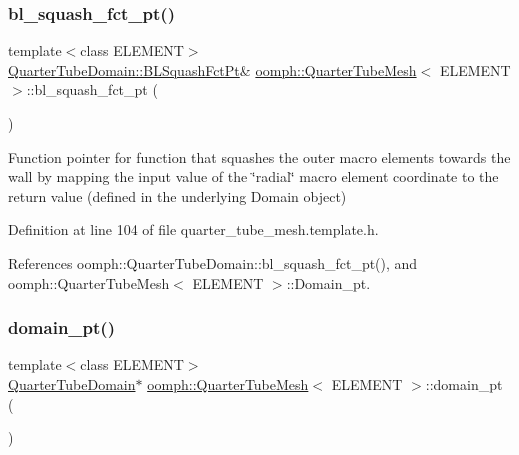 \mbox{\label{classoomph_1_1QuarterTubeMesh_afa145689b62afa7e66573c8c42bda8dd}} 
\subsubsection{\texorpdfstring{bl\+\_\+squash\+\_\+fct\+\_\+pt()}{bl\_squash\_fct\_pt()}}
{\footnotesize\ttfamily template$<$class E\+L\+E\+M\+E\+NT$>$ \\
\hyperlink{classoomph_1_1QuarterTubeDomain_a3d8c15c17d9912d8c519c028437c0b2c}{Quarter\+Tube\+Domain\+::\+B\+L\+Squash\+Fct\+Pt}\& \hyperlink{classoomph_1_1QuarterTubeMesh}{oomph\+::\+Quarter\+Tube\+Mesh}$<$ E\+L\+E\+M\+E\+NT $>$\+::bl\+\_\+squash\+\_\+fct\+\_\+pt (\begin{DoxyParamCaption}{ }\end{DoxyParamCaption})\hspace{0.3cm}{\ttfamily [inline]}}



Function pointer for function that squashes the outer macro elements towards the wall by mapping the input value of the \char`\"{}radial\char`\"{} macro element coordinate to the return value (defined in the underlying Domain object) 



Definition at line 104 of file quarter\+\_\+tube\+\_\+mesh.\+template.\+h.



References oomph\+::\+Quarter\+Tube\+Domain\+::bl\+\_\+squash\+\_\+fct\+\_\+pt(), and oomph\+::\+Quarter\+Tube\+Mesh$<$ E\+L\+E\+M\+E\+N\+T $>$\+::\+Domain\+\_\+pt.

\mbox{\label{classoomph_1_1QuarterTubeMesh_a5629c3a0d3f8a60165fb7024b851e3e3}} 
\subsubsection{\texorpdfstring{domain\+\_\+pt()}{domain\_pt()}\hspace{0.1cm}{\footnotesize\ttfamily [1/2]}}
{\footnotesize\ttfamily template$<$class E\+L\+E\+M\+E\+NT$>$ \\
\hyperlink{classoomph_1_1QuarterTubeDomain}{Quarter\+Tube\+Domain}$\ast$ \hyperlink{classoomph_1_1QuarterTubeMesh}{oomph\+::\+Quarter\+Tube\+Mesh}$<$ E\+L\+E\+M\+E\+NT $>$\+::domain\+\_\+pt (\begin{DoxyParamCaption}{ }\end{DoxyParamCaption})\hspace{0.3cm}{\ttfamily [inline]}}



